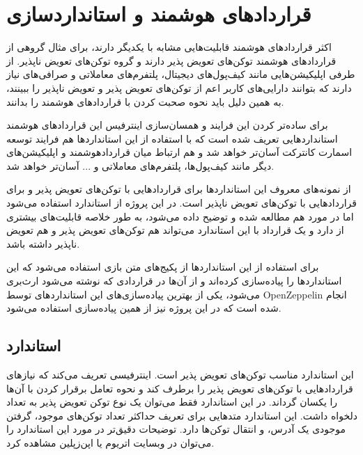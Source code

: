 \section{قرارداد‌های هوشمند و استانداردسازی}
اکثر قرارداد‌های هوشمند قابلیت‌هایی مشابه با یکدیگر دارند، برای مثال گروهی از قرارداد‌های هوشمند توکن‌های تعویض پذیر دارند و گروه توکن‌های تعویض ناپذیر. از طرفی اپلیکیشن‌هایی مانند کیف‌پول‌های دیجیتال، پلتفرم‌های معاملاتی و صرافی‌های نیاز دارند که بتوانند دارایی‌های کاربر اعم از توکن‌های تعویض پذیر و تعویض ناپذیر را ببینند، به همین دلیل باید نحوه صحبت کردن با قراردادهای هوشمند را بدانند.

برای ساده‌تر کردن این فرایند و همسان‌سازی اینترفیس  این قراردادهای هوشمند استانداردهایی تعریف شده است که با استفاده از این استانداردها هم فرایند توسعه اسمارت کانترکت آسان‌تر خواهد شد و هم ارتباط میان قراردادهوشمند و اپلیکیشن‌های دیگر مانند کیف‌پول‌ها، پلتفرم‌های معاملاتی و ... آسان‌تر خواهد شد.

از نمونه‌های معروف این استانداردها
برای قرارداد‌هایی با توکن‌های تعویض پذیر و
برای قراردادهایی با توکن‌های تعویض ناپذیر است. در این پروژه از استاندارد
استفاده می‌شود اما در مورد
هم مطالعه شده و توضیح داده می‌شود، به طور خلاصه
قابلیت‌های بیشتری از
دارد و یک قرارداد با این استاندارد می‌تواند هم توکن‌های تعویض پذیر و هم تعویض ناپذیر داشته باشد.

برای استفاده از این استاندارد‌ها از پکیج‌های متن بازی استفاده می‌شود که این استاندارد‌ها را پیاده‌سازی کرده‌اند و از آن‌ها در قراردادی که نوشته می‌شود ارث‌بری می‌شود، یکی از بهترین پیاده‌سازی‌های این استاندارد‌های توسط
\gls{OpenZeppelin}
انجام شده است که در این پروژه نیز از همین پیاده‌سازی استفاده می‌شود.

\subsection{استاندارد }
این استاندارد مناسب توکن‌های تعویض پذیر است. اینترفیسی تعریف می‌کند که نیازهای قراردادهایی با توکن‌های تعویض پذیر را برطرف کند و نحوه تعامل برقرار کردن با آن‌ها را یکسان گرداند. در این استاندارد فقط می‌توان یک نوع توکن تعویض پذیر به تعداد دلخواه داشت. این استاندارد متدهایی برای تعریف حداکثر تعداد توکن‌های موجود، گرفتن موجودی یک آدرس، و انتقال توکن‌ها دارد. توضیحات دقیق‌تر در مورد این استاندارد را می‌توان در وبسایت
اتریوم
یا اپن‌زپلین
مشاهده کرد.

